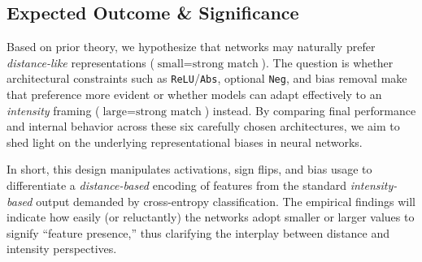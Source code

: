 \subsection{Expected Outcome \& Significance}
Based on prior theory, we hypothesize that networks may naturally prefer \emph{distance-like} representations (\( \text{small} = \text{strong match} \)). The question is whether architectural constraints such as \texttt{ReLU}/\texttt{Abs}, optional \texttt{Neg}, and bias removal make that preference more evident or whether models can adapt effectively to an \emph{intensity} framing (\( \text{large} = \text{strong match} \)) instead. By comparing final performance and internal behavior across these six carefully chosen architectures, we aim to shed light on the underlying representational biases in neural networks.

In short, this design manipulates activations, sign flips, and bias usage to differentiate a \emph{distance-based} encoding of features from the standard \emph{intensity-based} output demanded by cross-entropy classification. The empirical findings will indicate how easily (or reluctantly) the networks adopt smaller or larger values to signify ``feature presence,'' thus clarifying the interplay between distance and intensity perspectives.
